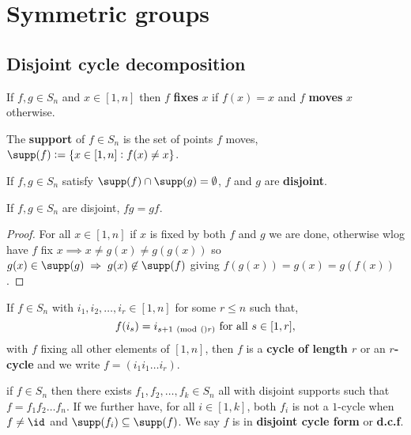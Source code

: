\documentclass[../Year1/Year1.tex]{subfiles}
\begin{document}
\section{Symmetric groups}

\subsection{Disjoint cycle decomposition}

\begin{definition}
    If $f,g\in S_n$ and $x\in[1,n]$ then $f$ \textbf{fixes} $x$ if $f(x)=x$ and $f$ \textbf{moves} $x$ otherwise. 
\end{definition}

\begin{definition}
    The \textbf{support} of $f\in S_n$ is the set of points $f$ moves, $\supp(f):=\{x\in[1,n]:f(x)\neq x\}$.
\end{definition}

\begin{definition}
    If $f,g\in S_n$ satisfy $\supp(f)\cap\supp(g)=\emptyset$, $f$ and $g$ are \textbf{disjoint}.
\end{definition}

\begin{lemma}
    If $f,g\in S_n$ are disjoint, $fg=gf$.
\end{lemma}

\begin{proof}
    For all $x\in[1,n]$ if $x$ is fixed by both $f$ and $g$ we are done, otherwise wlog have $f$ fix $x\implies x\neq g(x)\neq g(g(x))$ so $g(x)\in\supp(g)\implies g(x)\not\in\supp(f)$ giving $f(g(x))=g(x)=g(f(x))$.
\end{proof}

\begin{definition}[Cycles]
    If $f\in S_n$ with $i_1,i_2,\ldots,i_r\in[1,n]$ for some $r\leq n$ such that, \[
        f(i_s) = i_{s+1 \mod(r)} \ \text{\textcolor{black}{for all }} s\in[1,r]
    \textcolor{black}{,}
    \] with $f$ fixing all other elements of $[1,n]$, then $f$ is a \textbf{cycle of length $r$} or an \textbf{$r$-cycle} and we write $f=(i_1i_1\ldots i_r)$.
\end{definition}

\begin{theorem}
    if $f\in S_n$ then there exists $f_1,f_2,\ldots,f_k\in S_n$ all with disjoint supports such that $f=f_1f_2\ldots f_n$. If we further have, for all $i\in[1,k]$, both $f_i$ is not a $1$-cycle when $f\neq \id$ and $\supp(f_i)\subseteq\supp(f)$. We say $f$ is in \textbf{disjoint cycle form} or \textbf{d.c.f}.
\end{theorem}
\end{document}
